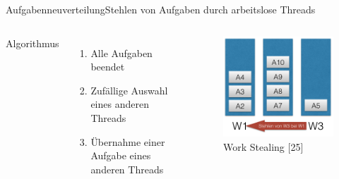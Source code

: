 \documentclass{beamer}
\begin{document}
\begin{frame}{Aufgabenneuverteilung}{Stehlen von Aufgaben durch arbeitslose Threads}
\begin{columns}

        Algorithmus
        \begin{enumerate}
        \item Alle Aufgaben beendet
        \item Zuf\"allige Auswahl eines anderen Threads
        \item \"Ubernahme einer Aufgabe eines anderen Threads
        \end{enumerate}

        \begin{figure}
        \centering
        \includegraphics[width=1\columnwidth]{./assets/W3FromW1.png}
        \caption{Work Stealing \cite{Herlihy1}[25]}
        \label{fig:my_label}
        \end{figure}
        
        
    
\end{columns}
\end{frame}
\end{document}
